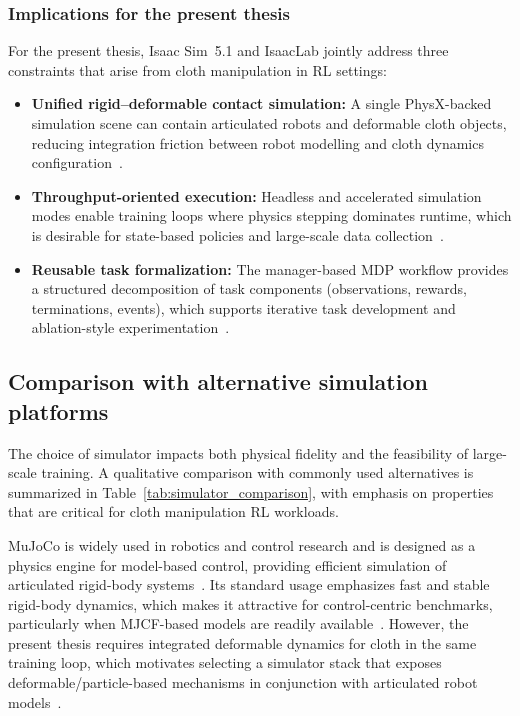 \subsubsection{Implications for the present thesis}
For the present thesis, Isaac Sim~5.1 and IsaacLab jointly address three constraints that arise from cloth manipulation in \ac{RL} settings:
\begin{itemize}
    \item \textbf{Unified rigid--deformable contact simulation:} A single PhysX-backed simulation scene can contain articulated robots and deformable cloth objects, reducing integration friction between robot modelling and cloth dynamics configuration~\cite{isaac_sim_510_physics_fundamentals,physx_541_gpu_rigid_bodies}.
    \item \textbf{Throughput-oriented execution:} Headless and accelerated simulation modes enable training loops where physics stepping dominates runtime, which is desirable for state-based policies and large-scale data collection~\cite{isaac_sim_510_physics_fundamentals,Makoviychuk2021IsaacGym}.
    \item \textbf{Reusable task formalization:} The manager-based \ac{MDP} workflow provides a structured decomposition of task components (observations, rewards, terminations, events), which supports iterative task development and ablation-style experimentation~\cite{isaaclab_mdp_api}.
\end{itemize}

\subsection{Comparison with alternative simulation platforms}
The choice of simulator impacts both physical fidelity and the feasibility of large-scale training.
A qualitative comparison with commonly used alternatives is summarized in Table~\ref{tab:simulator_comparison}, with emphasis on properties that are critical for cloth manipulation \ac{RL} workloads.

MuJoCo is widely used in robotics and control research and is designed as a physics engine for model-based control, providing efficient simulation of articulated rigid-body systems~\cite{Todorov2012MuJoCo}.
Its standard usage emphasizes fast and stable rigid-body dynamics, which makes it attractive for control-centric benchmarks, particularly when \ac{MJCF}-based models are readily available~\cite{Todorov2012MuJoCo}.
However, the present thesis requires integrated deformable dynamics for cloth in the same training loop, which motivates selecting a simulator stack that exposes deformable/particle-based mechanisms in conjunction with articulated robot models~\cite{physx_541_gpu_rigid_bodies}.

